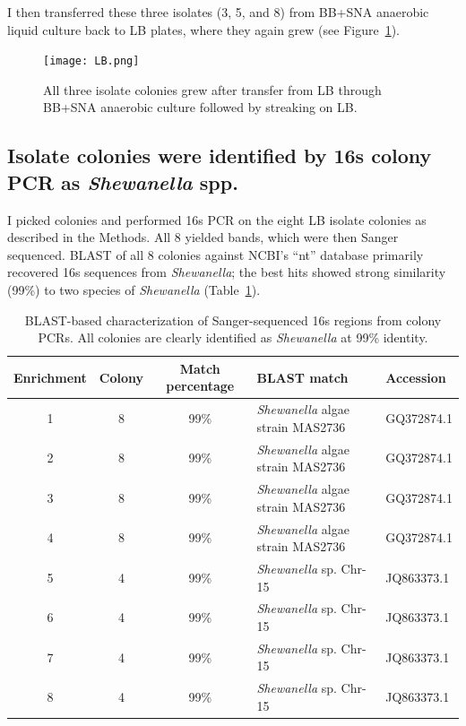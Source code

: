\documentclass{article}
\begin{document}
I then transferred these three isolates (3, 5, and 8) from BB+SNA
anaerobic liquid culture back to LB plates, where they again grew
(see Figure~\ref{fig:LB}).

\begin{figure}[!ht]
  \centerline{\texttt{[image: LB.png]}}
  \caption{All three isolate colonies grew after transfer from LB
    through BB+SNA anaerobic culture followed by streaking on LB.}
  \label{fig:LB}
\end{figure}

\subsection*{Isolate colonies were identified by 16s colony PCR as {\em Shewanella} spp.}

I picked colonies and performed 16s PCR on the eight LB isolate
colonies as described in the Methods.  All 8 yielded bands, which were
then Sanger sequenced.  BLAST of all 8 colonies against NCBI's ``nt''
database primarily recovered 16s sequences from {\em Shewanella}; the
best hits showed strong similarity (99\%) to two species of
{\em Shewanella} (Table~\ref{tab:16s}).

\begin{table}
\centering
\begin{tabular}{|c|c|c|l|l|}
\hline
Enrichment & Colony & Match percentage & BLAST match & Accession \\
\hline
1 &
8 &
99\% &
{\em Shewanella} algae strain MAS2736 &
GQ372874.1 \\

2 &
8 &
99\% &
{\em Shewanella} algae strain MAS2736 &
GQ372874.1 \\

3 &
8 &
99\% &
{\em Shewanella} algae strain MAS2736 &
GQ372874.1 \\

4 &
8 &
99\% &
{\em Shewanella} algae strain MAS2736 &
GQ372874.1 \\

5 &
4 &
99\% &
{\em Shewanella} sp. Chr-15 &
JQ863373.1 \\

6 &
4 &
99\% &
{\em Shewanella} sp. Chr-15 &
JQ863373.1 \\

7 &
4 &
99\% &
{\em Shewanella} sp. Chr-15 &
JQ863373.1 \\

8 &
4 &
99\% &
{\em Shewanella} sp. Chr-15 &
JQ863373.1 \\
\hline
\end{tabular}
\caption{BLAST-based characterization of Sanger-sequenced 16s regions from colony PCRs.  All colonies are clearly identified as {\em Shewanella} at 99\% identity.}
\label{tab:16s}
\end{table}
\end{document}
